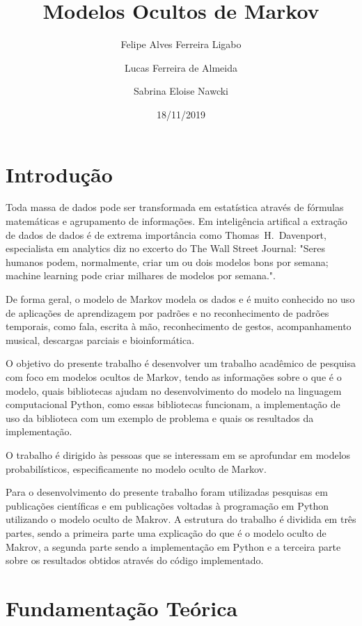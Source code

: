 \documentclass{article}
\title{Modelos Ocultos de Markov}
\author{
Felipe Alves Ferreira Ligabo\\
\and
Lucas Ferreira de Almeida\\
\and
Sabrina Eloise Nawcki\\
}
\date{18/11/2019}
\begin{document}
\maketitle

\tableofcontents

\section{Introdução}

Toda massa de dados pode ser transformada em estatística através de fórmulas matemáticas e agrupamento de informações. Em inteligência artifical a extração de dados de dados é de extrema importância como \mbox{Thomas H. Davenport}, especialista em analytics diz no excerto do The Wall Street Journal: "Seres humanos podem, normalmente, criar um ou dois modelos bons por semana; machine learning pode criar milhares de modelos por semana.".

De forma geral, o modelo de Markov modela os dados e é muito conhecido no uso de aplicações de aprendizagem por padrões e no reconhecimento de padrões temporais, como fala, escrita à mão, reconhecimento de gestos, acompanhamento musical, descargas parciais e bioinformática. 

O objetivo do presente trabalho é desenvolver um trabalho acadêmico de pesquisa com foco em modelos ocultos de Markov, tendo as informações sobre o que é o modelo, quais bibliotecas ajudam no desenvolvimento do modelo na linguagem computacional Python, como essas bibliotecas funcionam, a implementação de uso da biblioteca com um exemplo de problema e quais os resultados da implementação. 

O trabalho é dirigido às pessoas que se interessam em se aprofundar em modelos probabilísticos, especificamente no modelo oculto de Markov. 

Para o desenvolvimento do presente trabalho foram utilizadas pesquisas em publicações científicas e em publicações voltadas à programação em Python utilizando o modelo oculto de Makrov.
A estrutura do trabalho é dividida em três partes, sendo a primeira parte uma explicação do que é o modelo oculto de Makrov, a segunda parte sendo a implementação em Python e a terceira parte sobre os resultados obtidos através do código implementado. 

\section{Fundamentação Teórica}
\end{document}
